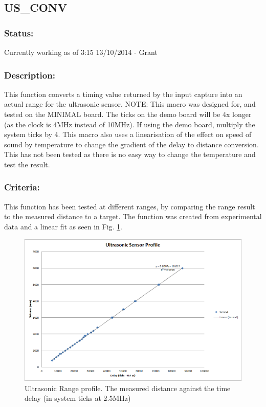 \documentclass[]{report}
\begin{document}
\subsection{US\_CONV}
\subsubsection{Status:}
Currently working as of 3:15 13/10/2014 - Grant

\subsubsection{Description:}
This function converts a timing value returned by the input capture into an actual range for the ultrasonic sensor. \newline
NOTE: This macro was designed for, and tested on the MINIMAL board. The ticks on the demo board will be 4x longer (as the clock is 4MHz instead of 10MHz). If using the demo board, multiply the system ticks by 4. \newline
This macro also uses a linearisation of the effect on speed of sound by temperature to change the gradient of the delay to distance conversion. This has not been tested as there is no easy way to change the temperature and test the result. 

\subsubsection{Criteria:}
This function has been tested at different ranges, by comparing the range result to the measured distance to a target. The function was created from experimental data and a linear fit as seen in Fig. \ref{fig:UltrasonicProfile}.

\begin{figure}
\centering
\includegraphics[width=0.7\linewidth]{"Ultrasonic Profile"}
\caption{Ultrasonic Range profile. The measured distance against the time delay (in system ticks at 2.5MHz)}
\label{fig:UltrasonicProfile}
\end{figure}
\end{document}
